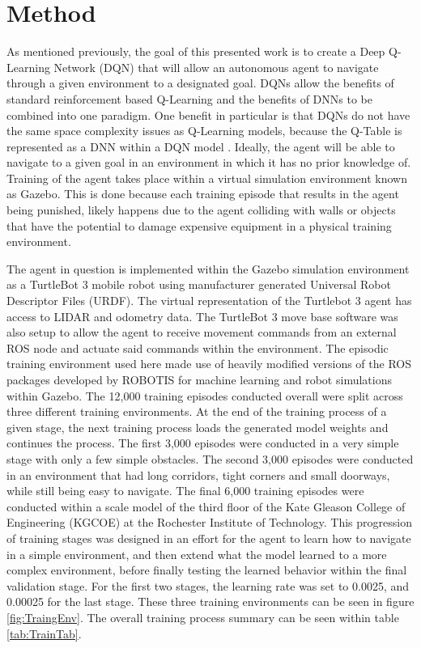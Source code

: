 \documentclass[conference]{IEEEtran}
\begin{document}
\section{Method}
As mentioned previously, the goal of this presented work is to create a Deep Q-Learning Network (DQN) that will allow an autonomous agent to navigate through a given environment to a designated goal. DQNs allow the benefits of standard reinforcement based Q-Learning and the benefits of DNNs to be combined into one paradigm. One benefit in particular is that DQNs do not have the same space complexity issues as Q-Learning models, because the Q-Table is represented as a DNN within a DQN model \cite{b3}. Ideally, the agent will be able to navigate to a given goal in an environment in which it has no prior knowledge of. Training of the agent takes place within a virtual simulation environment known as Gazebo. This is done because each training episode that results in the agent being punished, likely happens due to the agent colliding with walls or objects that have the potential to damage expensive equipment in a physical training environment. 

The agent in question is implemented within the Gazebo simulation environment as a TurtleBot 3 mobile robot using manufacturer generated Universal Robot Descriptor Files (URDF). The virtual representation of the Turtlebot 3 agent has access to LIDAR and odometry data. The TurtleBot 3 move base software was also setup to allow the agent to receive movement commands from an external ROS node and actuate said commands within the environment. The episodic training environment used here made use of heavily modified versions of the ROS packages developed by ROBOTIS for machine learning and robot simulations within Gazebo. The 12,000 training episodes conducted overall were split across three different training environments. At the end of the training process of a given stage, the next training process loads the generated model weights and continues the process. The first 3,000 episodes were conducted in a very simple stage with only a few simple obstacles. The second 3,000 episodes were conducted in an environment that had long corridors, tight corners and small doorways, while still being easy to navigate. The final 6,000 training episodes were conducted within a scale model of the third floor of the Kate Gleason College of Engineering (KGCOE) at the Rochester Institute of Technology. This progression of training stages was designed in an effort for the agent to learn how to navigate in a simple environment, and then extend what the model learned to a more complex environment, before finally testing the learned behavior within the final validation stage. For the first two stages, the learning rate was set to 0.0025, and 0.00025 for the last stage. These three training environments can be seen in figure \ref{fig:TraingEnv}. The overall training process summary can be seen within table \ref{tab:TrainTab}.
\end{document}
